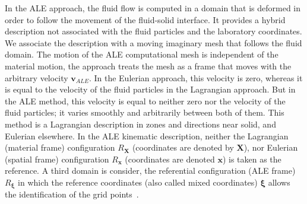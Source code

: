 In the ALE approach, the fluid flow is computed in a domain that is deformed in order to follow the movement of the fluid-solid interface. It provides a hybrid description not associated with the fluid particles and the laboratory coordinates. We associate the description with a moving imaginary mesh that follows the fluid domain.  The motion of the ALE computational mesh is independent of the material motion, the approach treats the mesh as a frame that moves with the arbitrary velocity $\mathbf{v}_{ALE}$. In the Eulerian approach, this velocity is zero, whereas it is equal to the velocity of the fluid particles in the Lagrangian approach. But in the ALE method, this velocity is equal to neither zero nor the velocity of the fluid particles; it varies smoothly and arbitrarily between both of them.  This method is a Lagrangian description in zones and directions near solid, and Eulerian elsewhere. 
In the ALE kinematic description, neither the Lagrangian (material frame) configuration ${R}_{\mathbf{X}}$ 
(coordinates are denoted by $ \mathbf{X}$), nor Eulerian (spatial frame) configuration $R_{\mathbf{x}}$ 
(coordinates are denoted $ \mathbf{x} $) is taken as the reference. A third domain is consider, 
the referential configuration (ALE frame) $R_{\boldsymbol{\xi}}$ in which the reference coordinates 
(also called mixed coordinates) $\boldsymbol{\xi}$ allows the identification of the grid 
points~\cite{donea2004arbitrary}. 
